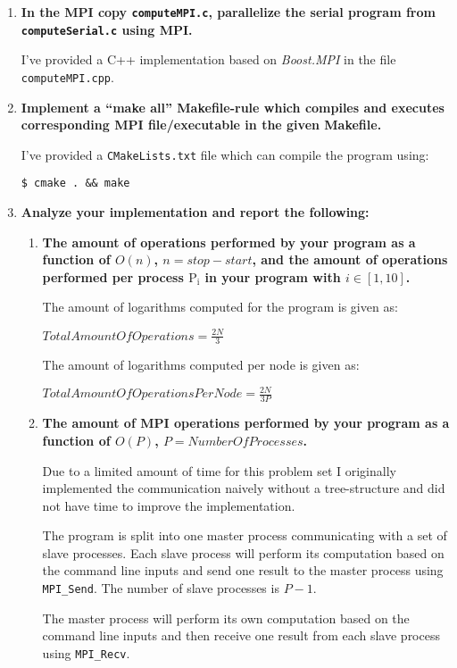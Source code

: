 \begin{enumerate}

\item \textbf{In the MPI copy \texttt{computeMPI.c}, parallelize the serial program from \texttt{computeSerial.c} using MPI.}

I've provided a C++ implementation based on \textit{Boost.MPI} in the file \texttt{computeMPI.cpp}.

\item \textbf{Implement a ``make all'' Makefile-rule which compiles and executes corresponding MPI file/executable in the given Makefile.}

I've provided a \texttt{CMakeLists.txt} file which can compile the program using:

\texttt{\$~cmake~.~\&\&~make}

\item \textbf{Analyze your implementation and report the following:}

\begin{enumerate}

\item \textbf{The amount of operations performed by your program as a function of $O(n)$, $n = stop - start$, and the amount of operations performed per process $\text{P}_\text{i}$ in your program with $i \in [1, 10]$.}

The amount of logarithms computed for the program is given as:

$TotalAmountOfOperations = \frac{2N}{3}$

The amount of logarithms computed per node is given as:

$TotalAmountOfOperationsPerNode = \frac{2N}{3P}$

\item \textbf{The amount of MPI operations performed by your program as a function of $O(P)$, $P = NumberOfProcesses$.}

Due to a limited amount of time for this problem set I originally implemented the communication naively without a tree-structure and did not have time to improve the implementation.

The program is split into one master process communicating with a set of slave processes. Each slave process will perform its computation based on the command line inputs and send one result to the master process using \texttt{MPI\_Send}. The number of slave processes is $P - 1$.

The master process will perform its own computation based on the command line inputs and then receive one result from each slave process using \texttt{MPI\_Recv}.


\end{enumerate}
\end{enumerate}
